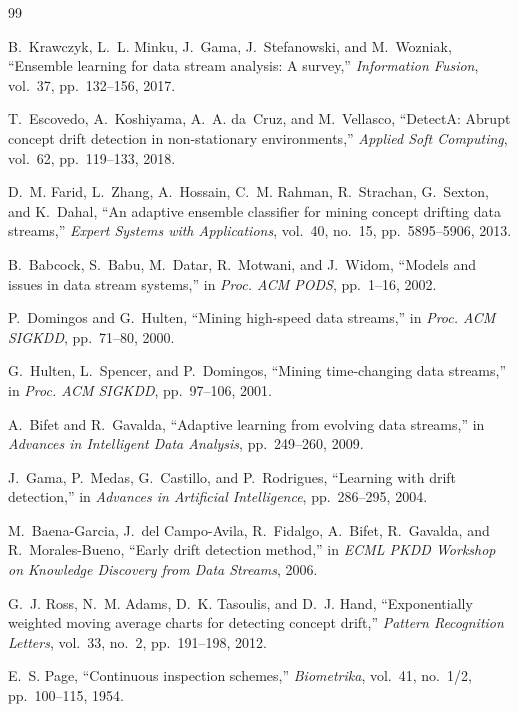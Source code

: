 ﻿\documentclass[12pt,a4paper]{article}
\begin{document}
\begin{thebibliography}{99}

B.~Krawczyk, L.~L. Minku, J.~Gama, J.~Stefanowski, and M.~Wozniak, ``Ensemble learning for data stream analysis: A survey,'' \emph{Information Fusion}, vol.~37, pp.~132--156, 2017.

T.~Escovedo, A.~Koshiyama, A.~A. da~Cruz, and M.~Vellasco, ``DetectA: Abrupt concept drift detection in non-stationary environments,'' \emph{Applied Soft Computing}, vol.~62, pp.~119--133, 2018.

D.~M. Farid, L.~Zhang, A.~Hossain, C.~M. Rahman, R.~Strachan, G.~Sexton, and K.~Dahal, ``An adaptive ensemble classifier for mining concept drifting data streams,'' \emph{Expert Systems with Applications}, vol.~40, no.~15, pp.~5895--5906, 2013.

B.~Babcock, S.~Babu, M.~Datar, R.~Motwani, and J.~Widom, ``Models and issues in data stream systems,'' in \emph{Proc. ACM PODS}, pp.~1--16, 2002.

P.~Domingos and G.~Hulten, ``Mining high-speed data streams,'' in \emph{Proc. ACM SIGKDD}, pp.~71--80, 2000.

G.~Hulten, L.~Spencer, and P.~Domingos, ``Mining time-changing data streams,'' in \emph{Proc. ACM SIGKDD}, pp.~97--106, 2001.

A.~Bifet and R.~Gavalda, ``Adaptive learning from evolving data streams,'' in \emph{Advances in Intelligent Data Analysis}, pp.~249--260, 2009.

J.~Gama, P.~Medas, G.~Castillo, and P.~Rodrigues, ``Learning with drift detection,'' in \emph{Advances in Artificial Intelligence}, pp.~286--295, 2004.

M.~Baena-Garcia, J.~del Campo-Avila, R.~Fidalgo, A.~Bifet, R.~Gavalda, and R.~Morales-Bueno, ``Early drift detection method,'' in \emph{ECML PKDD Workshop on Knowledge Discovery from Data Streams}, 2006.

G.~J. Ross, N.~M. Adams, D.~K. Tasoulis, and D.~J. Hand, ``Exponentially weighted moving average charts for detecting concept drift,'' \emph{Pattern Recognition Letters}, vol.~33, no.~2, pp.~191--198, 2012.

E.~S. Page, ``Continuous inspection schemes,'' \emph{Biometrika}, vol.~41, no.~1/2, pp.~100--115, 1954.


\end{thebibliography}
\end{document}
